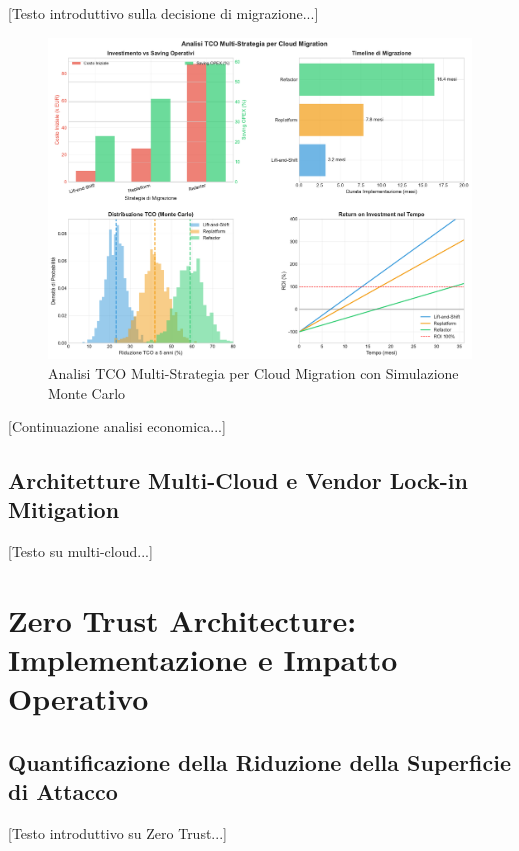 [Testo introduttivo sulla decisione di migrazione...]

\begin{figure}[htbp]
\centering
\includegraphics[width=\textwidth]{figura_3_3_cloud_tco.pdf}
\caption{Analisi TCO Multi-Strategia per Cloud Migration con Simulazione Monte Carlo}
\label{fig:cloud_tco}
\end{figure}

[Continuazione analisi economica...]

\subsection{Architetture Multi-Cloud e Vendor Lock-in Mitigation}

[Testo su multi-cloud...]


\section{Zero Trust Architecture: Implementazione e Impatto Operativo}

\subsection{Quantificazione della Riduzione della Superficie di Attacco}

[Testo introduttivo su Zero Trust...]

